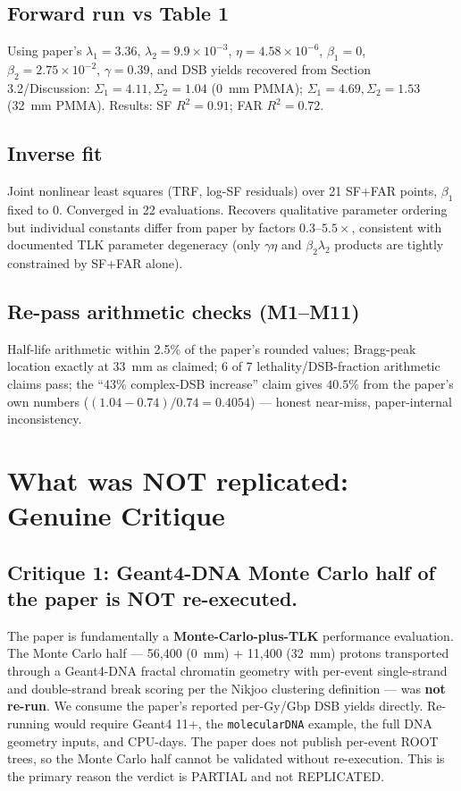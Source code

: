 \documentclass[11pt]{article}
\begin{document}
\subsection{Forward run vs Table 1}
Using paper's $\lambda_1{=}3.36$, $\lambda_2{=}9.9{\times}10^{-3}$,
$\eta{=}4.58{\times}10^{-6}$, $\beta_1{=}0$, $\beta_2{=}2.75{\times}10^{-2}$,
$\gamma{=}0.39$, and DSB yields recovered from Section 3.2/Discussion:
$\Sigma_1{=}4.11,\Sigma_2{=}1.04$ (0~mm PMMA); $\Sigma_1{=}4.69,\Sigma_2{=}1.53$
(32~mm PMMA). Results: SF $R^2 = 0.91$; FAR $R^2 = 0.72$.

\subsection{Inverse fit}
Joint nonlinear least squares (TRF, log-SF residuals) over 21 SF+FAR points,
$\beta_1$ fixed to 0. Converged in 22 evaluations. Recovers qualitative parameter
ordering but individual constants differ from paper by factors $0.3\text{--}5.5\times$,
consistent with documented TLK parameter degeneracy (only $\gamma\eta$ and
$\beta_2\lambda_2$ products are tightly constrained by SF+FAR alone).

\subsection{Re-pass arithmetic checks (M1--M11)}
Half-life arithmetic within 2.5\% of the paper's rounded values; Bragg-peak location
exactly at 33~mm as claimed; 6 of 7 lethality/DSB-fraction arithmetic claims pass;
the ``43\% complex-DSB increase'' claim gives $40.5\%$ from the paper's own numbers
($(1.04-0.74)/0.74=0.4054$) --- honest near-miss, paper-internal inconsistency.

\section{What was NOT replicated: Genuine Critique}

\subsection*{Critique 1: Geant4-DNA Monte Carlo half of the paper is NOT re-executed.}
The paper is fundamentally a \textbf{Monte-Carlo-plus-TLK} performance evaluation.
The Monte Carlo half --- 56,400 (0~mm) + 11,400 (32~mm) protons transported through
a Geant4-DNA fractal chromatin geometry with per-event single-strand and
double-strand break scoring per the Nikjoo clustering definition --- was
\textbf{not re-run}. We consume the paper's reported per-Gy/Gbp DSB yields
directly. Re-running would require Geant4 11+, the \texttt{molecularDNA} example,
the full DNA geometry inputs, and CPU-days. The paper does not publish per-event
ROOT trees, so the Monte Carlo half cannot be validated without re-execution.
This is the primary reason the verdict is PARTIAL and not REPLICATED.
\end{document}
